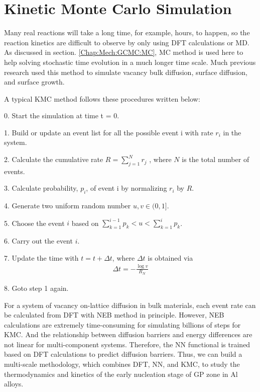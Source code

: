 \section{Kinetic Monte Carlo Simulation}
\label{Chap:Mech:KMC}

Many real reactions will take a long time, for example, hours, to happen, so the reaction kinetics are difficult to observe by only using \ac{DFT} calculations or \ac{MD}. As discussed in section. \ref{Chap:Mech:GCMC:MC}, \ac{MC} method is used here to help solving stochastic time evolution in a much longer time scale. Much previous research used this method to simulate vacancy bulk diffusion, surface diffusion, and surface growth. \cite{frenkel2001understanding, leach2001molecular}

A typical \ac{KMC} method follows these procedures written below:

0. Start the simulation at time t = 0.

1. Build or update an event list for all the possible event i with rate $r_i$ in the system.

2. Calculate the cumulative rate $R = \sum_{j=1}^N r_j$ , where $N$ is the total number of events. 

3. Calculate probability, $p_i$, of event i by normalizing $r_i$ by $R$.

4. Generate two uniform random number $u, v \in (0, 1]$.

5. Choose the event $i$ based on $\sum_{k=1}^{i-1} p_k < u < \sum_{k=1}^{i} p_k$.

6. Carry out the event $i$.

7. Update the time with $t = t + \Delta t$, where $\Delta t$ is obtained via
\begin{align}
    \Delta t = - \frac{\log{v}}{R_N}
    \label{Chap:Meth:eq:KMC:1}
\end{align}

8. Goto step 1 again.

For a system of vacancy on-lattice diffusion in bulk materials, each event rate can be calculated from \ac{DFT} with \ac{NEB} method in principle. However, \ac{NEB} calculations are extremely time-consuming for simulating billions of steps for \ac{KMC}. And the relationship between diffusion barriers and energy differences are not linear for multi-component systems. Therefore, the \ac{NN} functional is trained based on \ac{DFT} calculations to predict diffusion barriers. Thus, we can build a multi-scale methodology, which combines \ac{DFT}, \ac{NN}, and \ac{KMC}, to study the thermodynamics and kinetics of the early nucleation stage of GP zone in Al alloys.